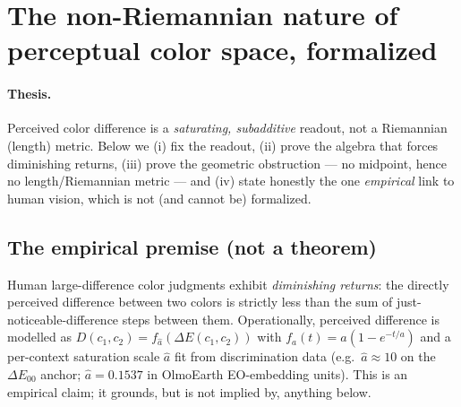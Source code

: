 
\section{The non-Riemannian nature of perceptual color space, formalized}

\paragraph{Thesis.} Perceived color difference is a \emph{saturating, subadditive}
readout, not a Riemannian (length) metric. Below we (i) fix the readout, (ii) prove
the algebra that forces diminishing returns, (iii) prove the geometric obstruction
— no midpoint, hence no length/Riemannian metric — and (iv) state honestly the one
\emph{empirical} link to human vision, which is not (and cannot be) formalized.

\subsection{The empirical premise (not a theorem)}

\begin{hypothesis}\label{hyp:bujack}
Human large-difference color judgments exhibit \emph{diminishing returns}: the
directly perceived difference between two colors is strictly less than the sum of
just-noticeable-difference steps between them. Operationally, perceived difference
is modelled as $D(c_1,c_2)=f_{\hat a}(\Delta E(c_1,c_2))$ with $f_a(t)=a(1-e^{-t/a})$
and a per-context saturation scale $\hat a$ fit from discrimination data
(e.g.\ $\hat a\approx 10$ on the $\Delta E_{00}$ anchor; $\hat a=0.1537$ in
OlmoEarth EO-embedding units). This is an empirical claim; it grounds, but is not
implied by, anything below.
\end{hypothesis}

